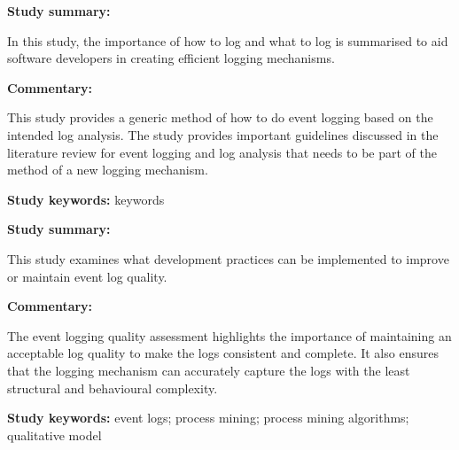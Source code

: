 \begin{tcolorbox}[colback=gray!5!white, colframe=deepblue!80!black, title=Learning to Log: Helping Developers Make Informed Logging Decisions \cite{Zhu2015}]
	\begin{minipage}[t]{0.25\textwidth}
		\textbf{Study summary:}
	\end{minipage}
	\hfill
	\begin{minipage}[t]{0.65\textwidth}
		In this study, the importance of how to log and what to log is summarised to aid software developers in creating efficient logging mechanisms. 
	\end{minipage}

	\vspace{0.75em} 

	\begin{minipage}[t]{0.25\textwidth}
		\textbf{Commentary:}
	\end{minipage}
	\hfill
	\begin{minipage}[t]{0.65\textwidth}
		This study provides a generic method of how to do event logging based on the intended log analysis. The study provides important guidelines discussed in the literature review for event logging and log analysis that needs to be part of the method of a new logging mechanism.
	\end{minipage}
	\tcblower
	\textbf{Study keywords:} keywords
\end{tcolorbox}

\clearpage

\begin{tcolorbox}[colback=gray!5!white, colframe=deepblue!80!black, title=owards a better assessment of event logs quality
	Mohammed\cite{Kherbouche2017}]
	\begin{minipage}[t]{0.25\textwidth}
		\textbf{Study summary:}
	\end{minipage}
	\hfill
	\begin{minipage}[t]{0.65\textwidth}
		This study examines what development practices can be implemented to improve or maintain event log quality.
	\end{minipage}

	\vspace{0.75em} 

	\begin{minipage}[t]{0.25\textwidth}
		\textbf{Commentary:}
	\end{minipage}
	\hfill
	\begin{minipage}[t]{0.65\textwidth}
		The event logging quality assessment highlights the importance of maintaining an acceptable log quality to make the logs consistent and complete. It also ensures that the logging mechanism can accurately capture the logs with the least structural and behavioural complexity. 
	\end{minipage}
	\tcblower
	\textbf{Study keywords:} event logs; process mining; process mining algorithms; qualitative model
\end{tcolorbox}

